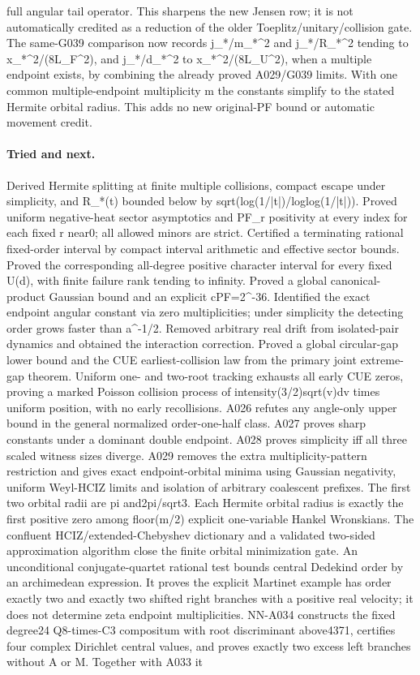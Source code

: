 full angular tail operator. This sharpens the new Jensen row; it is not automatically credited as a reduction of the older Toeplitz/unitary/collision gate. The same-G039 comparison now records j\_*/m\_*\textasciicircum{}2 and j\_*/R\_*\textasciicircum{}2 tending to x\_*\textasciicircum{}2/(8L\_F\textasciicircum{}2), and j\_*/d\_*\textasciicircum{}2 to x\_*\textasciicircum{}2/(8L\_U\textasciicircum{}2), when a multiple endpoint exists, by combining the already proved A029/G039 limits. With one common multiple-endpoint multiplicity m the constants simplify to the stated Hermite orbital radius. This adds no new original-PF bound or automatic movement credit.
\paragraph{Tried and next.} Derived Hermite splitting at finite multiple collisions, compact escape under simplicity, and R\_*(t) bounded below by sqrt(log(1/|t|)/loglog(1/|t|)). Proved uniform negative-heat sector asymptotics and PF\_r positivity at every index for each fixed r near0; all allowed minors are strict. Certified a terminating rational fixed-order interval by compact interval arithmetic and effective sector bounds. Proved the corresponding all-degree positive character interval for every fixed U(d), with finite failure rank tending to infinity. Proved a global canonical-product Gaussian bound and an explicit cPF=2\textasciicircum{}-36. Identified the exact endpoint angular constant via zero multiplicities; under simplicity the detecting order grows faster than a\textasciicircum{}-1/2. Removed arbitrary real drift from isolated-pair dynamics and obtained the interaction correction. Proved a global circular-gap lower bound and the CUE earliest-collision law from the primary joint extreme-gap theorem. Uniform one- and two-root tracking exhausts all early CUE zeros, proving a marked Poisson collision process of intensity(3/2)sqrt(v)dv times uniform position, with no early recollisions. A026 refutes any angle-only upper bound in the general normalized order-one-half class. A027 proves sharp constants under a dominant double endpoint. A028 proves simplicity iff all three scaled witness sizes diverge. A029 removes the extra multiplicity-pattern restriction and gives exact endpoint-orbital minima using Gaussian negativity, uniform Weyl-HCIZ limits and isolation of arbitrary coalescent prefixes. The first two orbital radii are pi and2pi/sqrt3. Each Hermite orbital radius is exactly the first positive zero among floor(m/2) explicit one-variable Hankel Wronskians. The confluent HCIZ/extended-Chebyshev dictionary and a validated two-sided approximation algorithm close the finite orbital minimization gate. An unconditional conjugate-quartet rational test bounds central Dedekind order by an archimedean expression. It proves the explicit Martinet example has order exactly two and exactly two shifted right branches with a positive real velocity; it does not determine zeta endpoint multiplicities. NN-A034 constructs the fixed degree24 Q8-times-C3 compositum with root discriminant above4371, certifies four complex Dirichlet central values, and proves exactly two excess left branches without A or M. Together with A033 it 